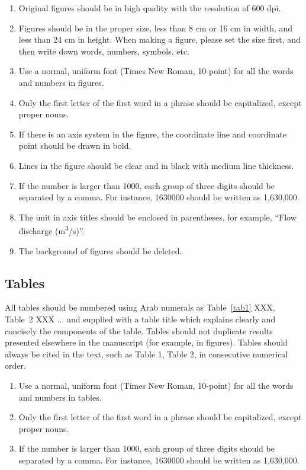 \documentclass{CVM}
\begin{document}
\begin{enumerate}

\item Original figures should be in high quality with the resolution of 600
dpi.

\item Figures should be in the proper size, less than 8 cm or 16 cm in width,
and less than 24 cm in height. When making a figure, please set the size
first, and then write down words, numbers, symbols, etc.

\item Use a normal, uniform font (Times New Roman, 10-point) for all the words
and numbers in figures.

\item Only the first letter of the first word in a phrase should be
capitalized, except proper nouns.

\item If there is an axis system in the figure, the coordinate line and
coordinate point should be drawn in bold.

\item Lines in the figure should be clear and in black with medium line
thickness.

\item If the number is larger than 1000, each group of three digits should be
separated by a comma. For instance, 1630000 should be written as 1{,}630{,}000.

\item The unit in axis titles should be enclosed in parentheses, for example,
``Flow discharge (\si{m^3/s})''.

\item The background of figures should be deleted.
\end{enumerate}

\subsection{Tables}
All tables should be numbered using Arab numerals as Table~\ref{tab1} XXX, Table~2 XXX ... and supplied with a table title which explains clearly and
concisely the components of the table. Tables should not duplicate results
presented elsewhere in the manuscript (for example, in figures). Tables
should always be cited in the text, such as Table 1, Table 2, in consecutive
numerical order.

\begin{enumerate}
\item Use a normal, uniform font (Times New Roman, 10-point) for all the words
and numbers in tables.

\item Only the first letter of the first word in a phrase should be capitalized, except proper nouns.

\item If the number is larger than 1000, each group of three digits should be
separated by a comma. For instance, 1630000 should be written as 1{,}630{,}000.
\end{enumerate}
\end{document}
